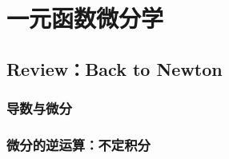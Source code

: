 \chapter{一元函数微分学}
    \section{Review：Back to Newton}
    \subsection{导数与微分}
    \subsection{微分的逆运算：不定积分}